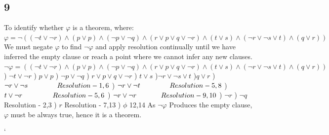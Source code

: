 \documentclass{article}
\begin{document}
	\subsection*{9}
	To identify whether $\varphi$ is a theorem, where:
	\newline
	$\varphi = \neg ((\neg t \lor \neg r) \land (p \lor p) \land (\neg p \lor \neg q) \land (r \lor p \lor q \lor \neg r) \land (t \lor s) 		\land (\neg r \lor \neg s \lor t) \land (q \lor r)) $
	\newline
	We must negate $\varphi$ to find $\neg \varphi$ and apply resolution continually until we have inferred the empty clause or reach a point where we cannot infer any new clauses.
	\newline
	\newline
	$\neg \varphi = ((\neg t \lor \neg r) \land (p \lor p) \land (\neg p \lor \neg q) \land (r \lor p \lor q \lor \neg r) \land (t \lor s) 		\land (\neg r \lor \neg s \lor t) \land (q \lor r)) $
	\newline
	) $ \neg t \lor \neg r $
	) $ p \lor p $
	) $ \neg p \lor \neg q $
	) $ r \lor p \lor q \lor \neg r $
	) $t \lor s$
	)$ \neg r \lor \neg s \lor t$
	)$ q \lor r $
	) $ \neg r \lor \neg s \hspace{15mm} Resolution - 1,6 $
	) $ \neg r \lor \neg t \hspace{15mm} Resolution -  5,8 $
	) $ t \lor \neg r \hspace{15.5mm} Resolution -  5,6 $
	) $ \neg r \lor \neg r\hspace{12.5mm} Resolution - 9,10 $
	) $ \neg r $
	) $ \neg q $\hspace{19.5mm} Resolution - 2,3
	) $ r $ \hspace{21mm} Resolution - 7,13
	) $ \phi $\hspace{21mm} 12,14
	\newline
	As $\neg \varphi$ Produces the empty clause, $\varphi$ must be always true, hence it is a theorem.
	
			`
\end{document}
